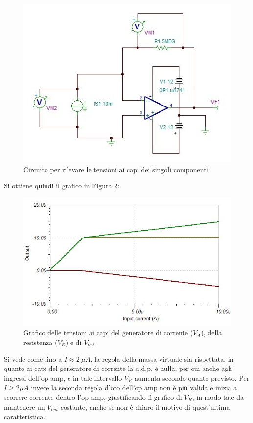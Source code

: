\documentclass[journal, a4paper]{IEEEtran}
\begin{document}
\begin{figure}[htp]
\caption{Circuito per rilevare le tensioni ai capi dei singoli componenti}
\label{circuito_tina}
\centering
\includegraphics[scale=.4]{newTINA}
\end{figure}

Si ottiene quindi il grafico in Figura \ref{graf_tens}:\\

\begin{figure}[htp]
\centering
\includegraphics[scale=.4]{immagine3}
\caption{Grafico delle tensioni ai capi del generatore di corrente ($V_A$), della resistenza ($V_R$) e di $V_{out}$\\}
\label{graf_tens}
\end{figure}


Si vede come fino a $I\approx 2~\mu A$, la regola della massa virtuale sia rispettata, in quanto ai capi del generatore di corrente la d.d.p. è nulla, per cui anche agli ingressi dell'op amp, e in tale intervallo $V_R$ aumenta secondo quanto previsto. Per $I\geq 2 \mu A$ invece la seconda regola d'oro dell'op amp non è più valida e inizia a scorrere corrente dentro l'op amp, giustificando il grafico di $V_R$, in modo tale da mantenere un $V_{out}$ costante, anche se non è chiaro il motivo di quest'ultima caratteristica.\\
\end{document}
